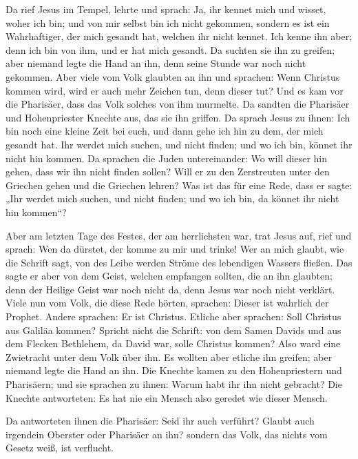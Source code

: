  Da rief Jesus im Tempel, lehrte und sprach: Ja, ihr
kennet mich und wisset, woher ich bin; und von mir selbst bin ich nicht
gekommen, sondern es ist ein Wahrhaftiger, der mich gesandt hat, welchen
ihr nicht kennet.  Ich kenne ihn aber; denn ich bin von
ihm, und er hat mich gesandt.  Da suchten sie ihn zu
greifen; aber niemand legte die Hand an ihn, denn seine Stunde war noch
nicht gekommen.  Aber viele vom Volk glaubten an ihn und
sprachen: Wenn Christus kommen wird, wird er auch mehr Zeichen tun, denn
dieser tut?  Und es kam vor die Pharisäer, dass das Volk
solches von ihm murmelte. Da sandten die Pharisäer und Hohenpriester
Knechte aus, das sie ihn griffen.  Da sprach Jesus zu
ihnen: Ich bin noch eine kleine Zeit bei euch, und dann gehe ich hin zu
dem, der mich gesandt hat.  Ihr werdet mich suchen, und
nicht finden; und wo ich bin, könnet ihr nicht hin kommen.
 Da sprachen die Juden untereinander: Wo will dieser hin
gehen, dass wir ihn nicht finden sollen? Will er zu den Zerstreuten
unter den Griechen gehen und die Griechen lehren?  Was
ist das für eine Rede, dass er sagte: „Ihr werdet mich suchen, und nicht
finden; und wo ich bin, da könnet ihr nicht hin kommen``?

 Aber am letzten Tage des Festes, der am herrlichsten
war, trat Jesus auf, rief und sprach: Wen da dürstet, der komme zu mir
und trinke!  Wer an mich glaubt, wie die Schrift sagt,
von des Leibe werden Ströme des lebendigen Wassers fließen.
 Das sagte er aber von dem Geist, welchen empfangen
sollten, die an ihn glaubten; denn der Heilige Geist war noch nicht da,
denn Jesus war noch nicht verklärt.  Viele nun vom Volk,
die diese Rede hörten, sprachen: Dieser ist wahrlich der Prophet.
 Andere sprachen: Er ist Christus. Etliche aber sprachen:
Soll Christus aus Galiläa kommen?  Spricht nicht die
Schrift: von dem Samen Davids und aus dem Flecken Bethlehem, da David
war, solle Christus kommen?  Also ward eine Zwietracht
unter dem Volk über ihn.  Es wollten aber etliche ihn
greifen; aber niemand legte die Hand an ihn.  Die Knechte
kamen zu den Hohenpriestern und Pharisäern; und sie sprachen zu ihnen:
Warum habt ihr ihn nicht gebracht?  Die Knechte
antworteten: Es hat nie ein Mensch also geredet wie dieser Mensch.

 Da antworteten ihnen die Pharisäer: Seid ihr auch
verführt?  Glaubt auch irgendein Oberster oder Pharisäer
an ihn?  sondern das Volk, das nichts vom Gesetz weiß,
ist verflucht.

